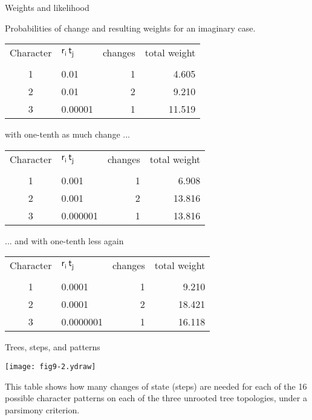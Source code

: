 \documentclass[bluish,slideColor,colorBG,pdf]{prosper}
\begin{document}
\begin{slide}[Replace]{Weights and likelihood}

Probabilities of change and resulting weights for an imaginary case.

\begin{center}
\begin{tabular}{c l r r}
Character & $\mathsf{r_i\,t_j}$ & changes & total weight\\
   &   &   & \\
1 & 0.01 & 1 &  4.605  \\
2 & 0.01 & 2 &  9.210  \\
3 & 0.00001 & 1 & 11.519
\end{tabular}
\end{center}

\end{slide}

\begin{slide}[Replace]{with one-tenth as much change ... }

\begin{center}  
\begin{tabular}{c l r r}
Character & $\mathsf{r_i\,t_j}$ & changes & total weight\\
   &   &   & \\
1 & 0.001 & 1 &  6.908  \\
2 & 0.001 & 2 &  13.816\\
3 & 0.000001 & 1 & 13.816
\end{tabular}
\end{center} 

\end{slide}

\begin{slide}[Replace]{ ... and with one-tenth less again}

\begin{center}
\begin{tabular}{c l r r}
Character & $\mathsf{r_i\,t_j}$ & changes & total weight\\
   &   &   & \\
1 & 0.0001 & 1 &  9.210  \\
2 & 0.0001 & 2 & 18.421  \\
3 & 0.0000001 & 1 & 16.118
\end{tabular}
\end{center}

\end{slide}

\begin{slide}[Replace]{Trees, steps, and patterns}

\centerline{\texttt{[image: fig9-2.ydraw]}}
\medskip

This table shows how many changes of state (steps) are needed for each
of the 16 possible character patterns on each of the three unrooted tree
topologies, under a parsimony criterion.

\end{slide}
\end{document}
